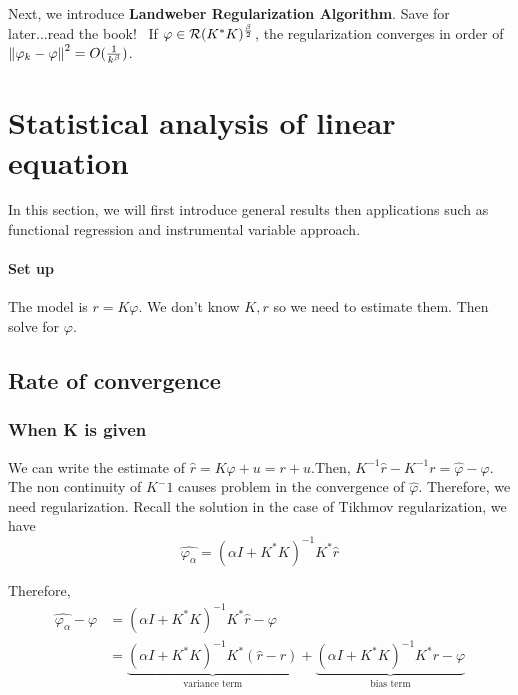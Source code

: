 Next, we introduce \textbf{Landweber Regularization Algorithm}. {\color{red}
Save for later...read the book! }\ If $\varphi \in
    \mathcal{R}(K^*K)^{\frac{\beta}{2}}$, the regularization converges in order of
$\left\| \varphi_k-\varphi \right\|^2=O(\frac{1}{k^\beta})$.

\section{Statistical analysis of linear equation}
In this section, we will first introduce general results then applications such
as functional regression and instrumental variable approach.

\paragraph{Set up} The model is $r=K\varphi$. We don't know $K,r$ so we need to estimate them.
Then solve for $\varphi$.

\subsection{Rate of convergence}
\subsubsection{When K is given}
We can write the estimate of $\hat{r}=K\varphi+u=r+u$.Then,
$K^{-1}\hat{r}-K^{-1}r=\hat{\varphi}-\varphi$. The non continuity of $K^-1$
causes problem in the convergence of $\hat{\varphi}$. Therefore, we need
regularization. Recall the solution in the case of Tikhmov regularization, we
have \begin{equation*}
    \hat{\varphi_\alpha}=(\alpha I+K^*K)^{-1}K^*\hat{r}
\end{equation*}

Therefore, \begin{equation*}
    \begin{split}
        \hat{\varphi_\alpha}-\varphi&=(\alpha I+K^*K)^{-1}K^*\hat{r}-\varphi\\
        &=\underbrace{(\alpha I+K^*K)^{-1}K^*(\hat{r}-r)}_{\text{variance term}}+\underbrace{(\alpha I+K^*K)^{-1}K^*r-\varphi}_{\text{bias term}}
    \end{split}
\end{equation*}
